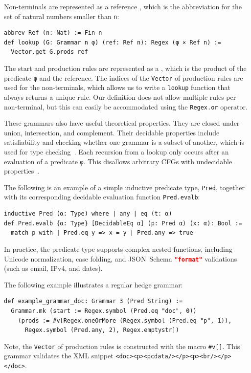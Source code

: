 \documentclass[runningheads]{llncs}
\newcommand{\Rule}{\link{Regex (φ × Ref n)}{Grammar}}
\newcommand{\Reference}{\link{Ref n}{Ref}}
\newcommand{\JSONSchema}{%
  JSON~Schema\xspace%
}
\newcommand{\format}{%
  \lstinline[language=json]|"format"|\xspace%
}
\newcommand{\CFGs}{\acp{CFG}\xspace}
\newcommand{\XML}{\ac{XML}\xspace}
\begin{document}
Non-terminals are represented as a reference \Reference, which is the abbreviation for the set of natural numbers smaller than \lstinline{n}:
\begin{lstlisting}[label=Ref]
abbrev Ref (n: Nat) := Fin n
def lookup (G: Grammar n φ) (ref: Ref n): Regex (φ × Ref n) :=
  Vector.get G.prods ref
\end{lstlisting}
The start and production rules are represented as a \Rule, which is the product of the predicate \lstinline{φ} and the reference.
The indices of the \lstinline{Vector} of production rules are used for the non-terminals, which allows us to write a \lstinline{lookup} function that always returns a unique rule.
Our definition does not allow multiple rules per non-terminal, but this can easily be accommodated using the \lstinline{Regex.or} operator.

These grammars also have useful theoretical properties.
They are closed under union, intersection, and complement. 
Their decidable properties include satisfiability and checking whether one grammar is a subset of another, which is used for type checking~\cite{hosoya2003xduce}.
Each recursion from a lookup only occurs after an evaluation of a predicate \lstinline{φ}.
This disallows arbitrary \CFGs with undecidable properties~\cite{hosoya2003xduce}.

The following is an example of a simple inductive predicate type, \lstinline{Pred}, together with its corresponding decidable evaluation function \lstinline{Pred.evalb}:
\begin{lstlisting}[label=AnyEqPred]
inductive Pred (α: Type) where | any | eq (t: α)
def Pred.evalb {α: Type} [DecidableEq α] (p: Pred α) (x: α): Bool :=
  match p with | Pred.eq y => x = y | Pred.any => true
\end{lstlisting}
In practice, the predicate type supports complex nested functions, including Unicode normalization, case folding, and \JSONSchema \format validations (such as email, IPv4, and dates).


The following example illustrates a regular hedge grammar:
\begin{lstlisting}[label=def example_grammar_doc]
def example_grammar_doc: Grammar 3 (Pred String) :=
  Grammar.mk (start := Regex.symbol (Pred.eq "doc", 0))
    (prods := #v[Regex.oneOrMore (Regex.symbol (Pred.eq "p", 1)),
      Regex.symbol (Pred.any, 2), Regex.emptystr])
\end{lstlisting}
Note, the \lstinline{Vector} of production rules is constructed with the macro \lstinline{#v[]}.
This grammar validates the \XML snippet \lstinline{<doc>}\allowbreak\lstinline{<p>}\allowbreak\lstinline{<pcdata/>}\allowbreak\lstinline{</p>}\allowbreak\lstinline{<p>}\allowbreak\lstinline{<br/>}\allowbreak\lstinline{</p>}\allowbreak\lstinline{</doc>}.
\end{document}
